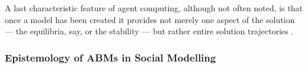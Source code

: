 \documentclass[11pt,oneside,a4paper,openright]{report}
\begin{document}
A last characteristic feature of agent computing, although not often noted, is that once a model has been created it provides not merely one aspect of the solution — the equilibria, say, or the stability — but rather entire solution trajectories \cite{Axtell2000}.\\




\subsubsection{Epistemology of ABMs in Social Modelling}
\end{document}
